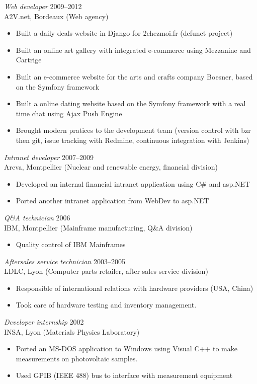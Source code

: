 \documentclass[line,resmargin]{res}
\begin{document}
\begin{resume}
{\sl Web developer\/} \hfill 2009--2012 \\
A2V.net, Bordeaux (Web agency)
\begin{itemize}  \itemsep -2pt
    \item Built a daily deals website in Django for 2chezmoi.fr (defunct project)
    \item Built an online art gallery with integrated e-commerce using Mezzanine and Cartrige
    \item Built an e-commerce website for the arts and crafts company Boesner, based on the Symfony framework
    \item Built a online dating website based on the Symfony framework with a real time chat using Ajax Push Engine
    \item Brought modern pratices to the development team (version control with bzr then git,
        issue tracking with Redmine, continuous integration with Jenkins)
\end{itemize}

{\sl Intranet developer\/} \hfill 2007--2009 \\
Areva, Montpellier (Nuclear and renewable energy, financial division)
\begin{itemize} \itemsep -2pt
    \item Developed an internal financial intranet application using C\# and asp.NET
    \item Ported another intranet application from WebDev to asp.NET
\end{itemize}

{\sl Q\&A technician\/} \hfill 2006 \\
IBM, Montpellier (Mainframe manufacturing, Q\&A division)
\begin{itemize}  \itemsep -2pt
    \item Quality control of IBM Mainframes
\end{itemize}

{\sl Aftersales service technician\/} \hfill     2003--2005 \\
LDLC, Lyon (Computer parts retailer, after sales service division)
\begin{itemize}  \itemsep -2pt
    \item Responsible of international relations with hardware providers (USA, China)
    \item Took care of hardware testing and inventory management.
\end{itemize}

{\sl Developer internship\/} \hfill 2002 \\
INSA, Lyon (Materials Physics Laboratory)
\begin{itemize} \itemsep -2pt
    \item Ported an MS-DOS application to Windows using Visual C++ to make
    measurements on photovoltaic samples.
    \item Used GPIB (IEEE 488) bus to interface with measurement equipment
\end{itemize}


\end{resume}
\end{document}
